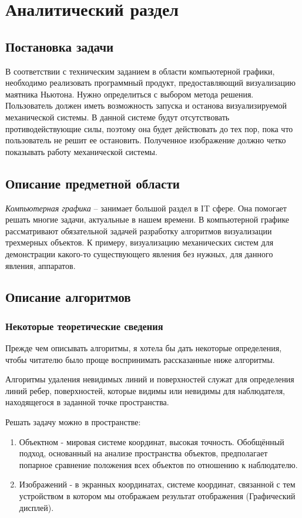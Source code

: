 \chapter{Аналитический раздел}
\label{cha:analysis}
\section{Постановка задачи}
В соответствии с техническим заданием в области компьютерной графики, необходимо реализовать программный продукт, предоставляющий визуализацию маятника Ньютона. Нужно определиться с выбором метода решения. Пользователь должен иметь возможность запуска и останова визуализируемой механической системы. В данной системе будут отсутствовать противодействующие силы, поэтому она будет действовать до тех пор, пока что пользователь не решит ее остановить. Полученное изображение должно четко показывать работу механической системы.

\section {Описание предметной области}
\textit{Компьютерная графика } -- занимает большой раздел в IT сфере. Она помогает решать многие задачи, актуальные в нашем времени. В компьютерной графике рассматривают обязательной задачей разработку алгоритмов визуализации трехмерных объектов. К примеру, визуализацию механических систем для демонстрации какого-то существующего явления без нужных, для данного явления, аппаратов.

\section {Описание алгоритмов}

\subsection {Некоторые теоретические сведения}

Прежде чем описывать алгоритмы, я хотела бы дать некоторые определения, чтобы читателю было проще воспринимать рассказанные ниже алгоритмы.

Алгоритмы удаления невидимых линий и поверхностей служат для определения линий ребер, поверхностей, которые видимы или невидимы для наблюдателя, находящегося в заданной точке пространства.

Решать задачу можно в пространстве:
\begin{enumerate}
	\item Объектном - мировая системе координат, высокая точность. Обобщённый подход, основанный на анализе пространства объектов, предполагает попарное сравнение положения всех объектов по отношению к наблюдателю.
	\item Изображений - в экранных координатах, системе координат, связанной с тем устройством в котором мы отображаем результат отображения (Графический дисплей).
\end{enumerate}	

